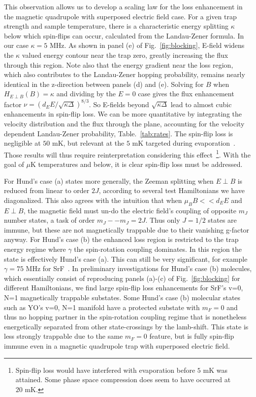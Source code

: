 \documentclass[%
 reprint,
groupedaddress,
 amsmath,amssymb,
 aps,
prl,
]{revtex4-1}
\newcommand{\epb}{$E\!\perp\!B$}
\newcommand{\epbm}{{E\!\perp\!B}}
\begin{document}
This observation allows us to develop a scaling law for the loss enhancement in the magnetic quadrupole with superposed electric field case. For a given trap strength and sample temperature, there is a characteristic energy splitting $\kappa$ below which spin-flips can occur, calculated from the Landau-Zener formula. In our case $\kappa=5\text{ MHz}$. As shown in panel (e) of Fig.~\ref{fig:blocking}, E-field widens the $\kappa$ valued energy contour near the trap zero, greatly increasing the flux through this region. Note also that the energy gradient near the loss region, which also contributes to the Landau-Zener hopping probability, remains nearly identical in the z-direction between panels (d) and (e). Solving for $B$ when $H_\epbm(B)=\kappa$ and dividing by the $E=0$ case gives the flux enhancement factor $\nu = (d_EE/\sqrt{\kappa\Delta})^{8/3}$. So E-fields beyond $\sqrt{\kappa\Delta}$ lead to almost cubic enhancements in spin-flip loss. We can be more quantitative by integrating the velocity distribution and the flux through the plane, accounting for the velocity dependent Landau-Zener probability, Table.~\ref{tab:rates}. The spin-flip loss is negligible at $50\text{ mK}$, but relevant at the $5\text{ mK}$ targeted during evaporation~\cite{Stuhl2012evap}. Those results will thus require reinterpretation considering this effect~\footnote{Spin-flip loss would have interfered with evaporation before $5\text{ mK}$ was attained. Some phase space compression does seem to have occurred at $20\text{ mK}$.}. With the goal of $\mu\text{K}$ temperatures and below, it is clear spin-flip loss must be addressed. 

For Hund's case (a) states more generally, the Zeeman splitting when \epb{}  is reduced from linear to order $2J$, according to several test Hamiltonians we have diagonalized. This also agrees with the intuition that when $\mu_BB<<d_EE$ and \epb, the magnetic field must un-do the electric field's coupling of opposite $m_J$ number states, a task of order $m_J--m_J=2J$. Thus only $J=1/2$ states are immune, but these are not magnetically trappable due to their vanishing g-factor anyway. For Hund's case (b) the enhanced loss region is restricted to the trap energy regime where $\gamma$ the spin-rotation coupling dominates. In this region the state is effectively Hund's case (a). This can still be very significant, for example $\gamma=75\text{ MHz}$ for SrF~\cite{Quemener2016}. In preliminary investigations for Hund's case (b) molecules, which essentially consist of reproducing panels (a)-(c) of Fig.~\ref{fig:blocking} for different Hamiltonians, we find large spin-flip loss enhancements for SrF's v=0, N=1 magnetically trappable substates. Some Hund's case (b) molecular states such as YO's v=0, N=1 manifold have a protected substate with $m_F=0$ and thus no hopping partner in the spin-rotation coupling regime that is nonetheless energetically separated from other state-crossings by the lamb-shift. This state is less strongly trappable due to the same $m_F=0$ feature, but is fully spin-flip immune even in a magnetic quadrupole trap with superposed electric field.
\end{document}
